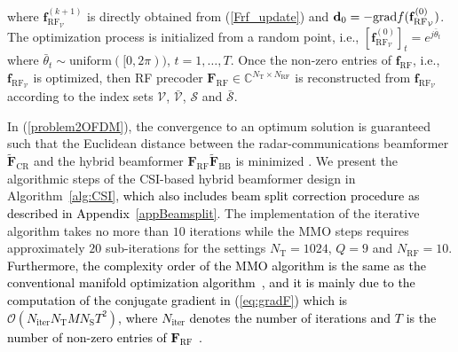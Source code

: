 \documentclass[journal,10pt]{IEEEtran}
\begin{document}
	where $\mathbf{f}_{\mathrm{RF}_\mathcal{V}}^{(k+1)}$ is directly obtained from (\ref{Frf_update}) and ${\bf d}_{0} =- \mathrm{grad}f(\mathbf{f}_{\mathrm{RF}_\mathcal{V}}^{(0)})$. The optimization process is initialized from a random point, i.e., $[\mathbf{f}_{\mathrm{RF}_\mathcal{V}}^{(0)}]_{t} = e^{j\bar{\theta}_{t}}$ where $\bar{\theta}_{t} \sim \mathrm{uniform}([0,2\pi))$, $t = 1,\dots,T$. Once the non-zero entries of $\mathbf{f}_\mathrm{RF}$, i.e., $\mathbf{f}_{\mathrm{RF}_\mathcal{V}}$ is optimized, then RF precoder $\mathbf{F}_\mathrm{RF}\in \mathbb{C}^{N_\mathrm{T}\times N_\mathrm{RF}}$ is reconstructed from $\mathbf{f}_{\mathrm{RF}_\mathcal{V}}$ according to the index sets $\mathcal{V}$, $\bar{\mathcal{V}}$, $\mathcal{S}$  and $\bar{\mathcal{S}}$.
	
	In (\ref{problem2OFDM}), the convergence to an optimum solution is guaranteed such that the Euclidean distance between the radar-communications beamformer $\widetilde{\mathbf{F}}_\mathrm{CR}$ and the hybrid beamformer $\mathbf{F}_\mathrm{RF}\widetilde{\mathbf{F}}_\mathrm{BB}$ is minimized \cite{hybridBFAltMin}. We present the algorithmic steps of the CSI-based hybrid beamformer design in Algorithm~\ref{alg:CSI}, \textcolor{black}{which also includes beam split correction procedure as described in Appendix~\ref{appBeamsplit}}. The implementation of the iterative algorithm takes no more than $10$ iterations while the MMO steps requires approximately $20$ sub-iterations for the settings $N_\mathrm{T} = 1024$, $Q = 9$ and $N_\mathrm{RF} = 10$. \textcolor{black}{Furthermore, the complexity order of the MMO algorithm is the same as the conventional manifold optimization algorithm~\cite{hybridBFAltMin}, and it is mainly due to the computation of the conjugate gradient in (\ref{eq:gradF}) which is $\mathcal{O}(N_\mathrm{iter}N_\mathrm{T}M N_\mathrm{S} T^2) $, where $N_\mathrm{iter}$ denotes the number of iterations and $T$ is the number of non-zero entries of $\mathbf{F}_\mathrm{RF}$~\cite{radarCommLiuICASSP2019,hybridBFAltMin,manopt}.  }
	
	
	
\end{document}
